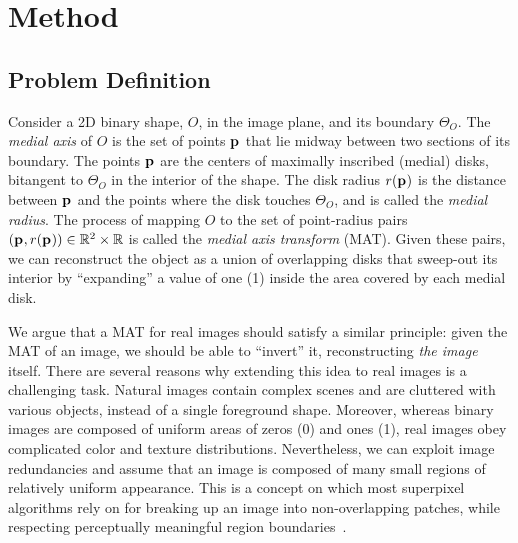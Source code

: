 \documentclass[10pt,twocolumn,letterpaper]{article}
\begin{document}
\section{Method}\label{sec:method}
\subsection{Problem Definition}\label{sec:method:definition}
Consider a 2D binary shape, $O$, in the image plane, and its boundary $\Theta_O$.
The \emph{medial axis} of $O$ is the set of points $\mathbf{p}_{}$ that lie midway between two sections of 
its boundary. The points $\mathbf{p}_{}$ are the centers of maximally inscribed (medial) disks, bitangent to $\Theta_O$
in the interior of the shape. The disk radius $r(\mathbf{p}_{})$ is the distance between $\mathbf{p}_{}$ and 
the points where the disk touches $\Theta_O$, and is called the \emph{medial radius}.
The process of mapping $O$ to the set of point-radius pairs $(\mathbf{p}_{},r(\mathbf{p}_{})) \in \mathbb{R}^2 \times \mathbb{R}$
is called the \emph{medial axis transform} (MAT).
Given these pairs, we can reconstruct the object as a union of overlapping disks that sweep-out 
its interior by ``expanding'' a value of one (1) inside the area covered by each  medial disk.

We argue that a MAT for real images should satisfy a similar principle: given the MAT of an image, 
we should be able to ``invert'' it, reconstructing \emph{the image} itself.
There are several reasons why extending this idea to real images is a challenging task. 
Natural images contain complex scenes and are cluttered with various objects, instead of a single foreground shape.
Moreover, whereas binary images are composed of uniform areas of zeros (0) and ones (1), 
real images obey complicated color and texture distributions.
Nevertheless, we can exploit image redundancies and assume that an image is composed of many small regions of 
relatively uniform appearance.
This is a concept on which most superpixel algorithms rely on for breaking up an image 
into non-overlapping patches, while respecting perceptually meaningful region 
boundaries~\cite{shi2000normalized,levinshtein2009turbopixels,achanta2012slic}. 
\end{document}
